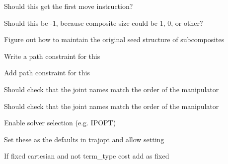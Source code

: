 \begin{DoxyRefList}
%
Should this get the first move instruction?  
\item[Member \mbox{\hyperlink{structtesseract__planning_1_1TaskInput_a76282121b3d486b03a098cdc8124ad39}{tesseract\+\_\+planning\+::Task\+Input\+::size}} ()]\label{todo__todo000059}%
%
Should this be -\/1, because composite size could be 1, 0, or other?  
\item[Member \mbox{\hyperlink{classtesseract__planning_1_1TimeOptimalTrajectoryGeneration_a808c675ec842305c839339e77f1103cf}{tesseract\+\_\+planning\+::Time\+Optimal\+Trajectory\+Generation\+::compute\+Time\+Stamps}} (\mbox{\hyperlink{classtesseract__planning_1_1CompositeInstruction}{Composite\+Instruction}} \&program, const Eigen\+::\+Ref$<$ const Eigen\+::\+Vector\+Xd $>$ \&max\+\_\+velocity, const Eigen\+::\+Ref$<$ const Eigen\+::\+Vector\+Xd $>$ \&max\+\_\+acceleration, double max\+\_\+velocity\+\_\+scaling\+\_\+factor=1.\+0, double max\+\_\+acceleration\+\_\+scaling\+\_\+factor=1.\+0) const]\label{todo__todo000063}%
%
Figure out how to maintain the original seed structure of subcomposites  
\item[Member \mbox{\hyperlink{classtesseract__planning_1_1TrajOptIfoptLegacyMotionPlanner_a7f3e4156fd81d3df4a909397aba68167}{tesseract\+\_\+planning\+::Traj\+Opt\+Ifopt\+Legacy\+Motion\+Planner\+::create\+Problem}} (const \mbox{\hyperlink{structtesseract__planning_1_1PlannerRequest}{Planner\+Request}} \&request) const]\label{todo__todo000049}%
%
Write a path constraint for this 

\label{todo__todo000050}%
%
Add path constraint for this 

\label{todo__todo000051}%
%
Should check that the joint names match the order of the manipulator 

\label{todo__todo000052}%
%
Should check that the joint names match the order of the manipulator  
\item[Member \mbox{\hyperlink{classtesseract__planning_1_1TrajOptIfoptLegacyMotionPlanner_a1a2423387fb024efa8909ea5d29935b7}{tesseract\+\_\+planning\+::Traj\+Opt\+Ifopt\+Legacy\+Motion\+Planner\+::solve}} (const \mbox{\hyperlink{structtesseract__planning_1_1PlannerRequest}{Planner\+Request}} \&request) const override]\label{todo__todo000047}%
%
Enable solver selection (e.\+g. IPOPT) 

\label{todo__todo000048}%
%
Set these as the defaults in trajopt and allow setting  
\item[Member \mbox{\hyperlink{classtesseract__planning_1_1TrajOptIfoptMotionPlanner_a110527b1475e5b5f8622997825e29e35}{tesseract\+\_\+planning\+::Traj\+Opt\+Ifopt\+Motion\+Planner\+::create\+Problem}} (const \mbox{\hyperlink{structtesseract__planning_1_1PlannerRequest}{Planner\+Request}} \&request) const]\label{todo__todo000055}%
%
If fixed cartesian and not term\+\_\+type cost add as fixed 


\end{DoxyRefList}
